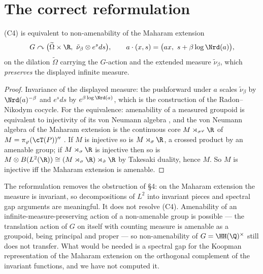 \section{The correct reformulation}

\begin{proposition}[Maharam]\label{XI:prop:maharam}
(C4) is equivalent to non-amenability of the Maharam extension \cite{Maharam}
\[
G\curvearrowright\bigl(\widetilde\Omega\times\R,\ \tilde\nu_\beta\otimes e^{s}ds\bigr),
\qquad a\cdot(x,s)=\bigl(ax,\ s+\beta\log\Nrd(a)\bigr),
\]
on the dilation $\widetilde\Omega$ carrying the $G$-action and the extended measure
$\tilde\nu_\beta$, which \emph{preserves} the displayed infinite measure.
\end{proposition}

\begin{proof}
Invariance of the displayed measure: the pushforward under $a$ scales $\tilde\nu_\beta$ by
$\Nrd(a)^{-\beta}$ and $e^sds$ by $e^{\beta\log\Nrd(a)}$, which is the construction of the
Radon--Nikodym cocycle. For
the equivalence: amenability of a measured groupoid is equivalent to injectivity of its
von Neumann algebra \cite{AD}, and the von Neumann algebra of the Maharam extension is the
continuous core $M\rtimes_{\sigma^\varphi}\R$ of $M=\pi_\varphi(\cT(P))''$ \cite[Ch.~XII]{Takesaki}.
If $M$ is injective so is $M\rtimes_{\sigma}\R$, a crossed product by an amenable group; if
$M\rtimes_\sigma\R$ is injective then so is $M\otimes B(L^2(\R))\cong(M\rtimes_\sigma\R)\rtimes_{\hat\sigma}\R$
by Takesaki duality, hence $M$. So $M$ is injective iff the Maharam extension is amenable.
\end{proof}

\begin{remark}\label{XI:rem:maharamstatus}
The reformulation removes the obstruction of \S4: on the Maharam extension the measure is
invariant, so decompositions of $L^2$ into invariant pieces and spectral gap arguments are
meaningful. It does not resolve (C4). Amenability of an infinite-measure-preserving action of
a non-amenable group is possible --- the translation action of $G$ on itself with counting
measure is amenable as a groupoid, being principal and proper --- so non-amenability of
$G=\HH(\Q)^\times$ still does not transfer. What would be needed is a spectral gap for the
Koopman representation of the Maharam extension on the orthogonal complement of the invariant
functions, and we have not computed it.
\end{remark}

